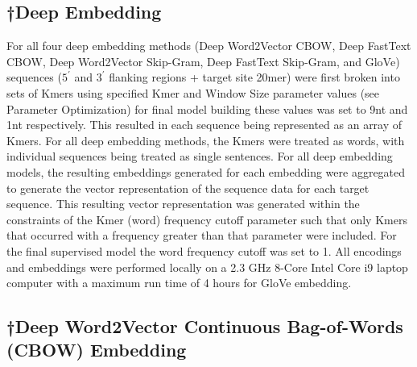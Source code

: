 \documentclass{report}
\begin{document}
\subsection{†Deep Embedding}\label{met:deep embedding}

For all four deep embedding methods (Deep Word2Vector CBOW, Deep FastText CBOW, Deep Word2Vector Skip-Gram, Deep FastText Skip-Gram, and GloVe) sequences ($5^\prime$ and $3^\prime$ flanking regions + target site 20mer) were first broken into sets of Kmers using specified Kmer and Window Size parameter values (see Parameter Optimization) for final model building these values was set to 9nt and 1nt respectively. This resulted in each sequence being represented as an array of Kmers. For all deep embedding methods, the Kmers were treated as words, with individual sequences being treated as single sentences. For all deep embedding models, the resulting embeddings generated for each embedding were aggregated to generate the vector representation of the sequence data for each target sequence. This resulting vector representation was generated within the constraints of the Kmer (word) frequency cutoff parameter such that only Kmers that occurred with a frequency greater than that parameter were included. For the final supervised model the word frequency cutoff was set to 1. All encodings and embeddings were performed locally on a 2.3 GHz 8-Core Intel Core i9 laptop computer with a maximum run time of 4 hours for GloVe embedding.

\subsection{†Deep Word2Vector Continuous Bag-of-Words (CBOW) Embedding}\label{met:word2vector cbow}
\end{document}
